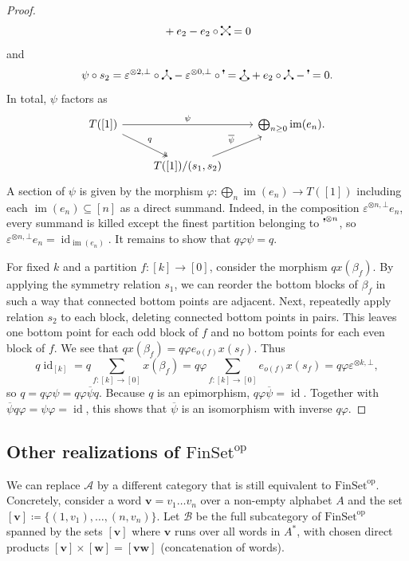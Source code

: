 \documentclass[11pt]{amsart}
\newcommand{\pd}[2][black]{\filldraw[#1] (#2) circle (1.5pt)} %
\newcommand\crossing{\tikz[baseline=(origin.base),scale=0.5]{
    \coordinate (origin) at (0,0); %
    \pd{0,0}; \pd{.5,0}; \pd{0,.5}; \pd{.5,.5};
    \draw (0,0) -- (.5,.5);
    \draw (.5,0) -- (0,.5);
}}
\newcommand\comult{\tikz[baseline=(origin.base),scale=0.5]{
    \coordinate (origin) at (0,0); %
    \pd{.25,.5}; \pd{0,0}; \pd{.5,0};
    \draw (.25,.5) -- (.25,.25) -- (0,0);
    \draw (.25,.25) -- (.5,0);
}}
\newcommand\upperdots[1]{\tikz[baseline=(origin.base),scale=0.5]{
    \coordinate (origin) at (0,0);
    \foreach \i in {0,...,\numexpr#1-1\relax} {
        \pd{0.5*\i,.5};
        \draw (0.5*\i,.3) -- (0.5*\i,.5);
    }
}}
\theoremstyle{definition}
\theoremstyle{remark}
\newcommand\cA{\mathcal A}
\newcommand\cB{\mathcal B}
\newcommand\id{\operatorname{id}}
\newcommand\im{\operatorname{im}}
\renewcommand\:\colon
\renewcommand\o\otimes
\renewcommand\o\otimes
\renewcommand\:\colon
\newcommand\FinSet{\mathrm{FinSet}}
\newcommand\op{^{\mathrm{op}}}
\newcommand\eps{\varepsilon}
\newcommand\vfi{\varphi}
\begin{document}
\begin{proof}
\[{        } + e_2 - e_2 \circ \crossing = 0
    \]
    and
    \[
        \psi \circ s_2 = \eps^{\o 2,\bot} \circ \comult - \eps^{\o 0,\bot} \circ \upperdots{1} = \tikz[baseline=(origin.base),scale=0.5]{
            \coordinate (origin) at (0,0);
            \pd{.25,.5}; \pd{0,0}; \pd{.5,0};
            \draw (.25,.5) -- (.25, .25) -- (0,0) to[out=down,in=down] (.5,0) -- (.25, .25);
        } + e_2 \circ \comult - \upperdots{1} = 0.
    \]
    In total, $\psi$ factors as
    \[\begin{tikzcd}
        T([1]) \arrow{rr}{\psi} \arrow[two heads]{rd}{q} && \bigoplus_{n \geq 0} \im(e_n). \\
        & T([1])/(s_1, s_2) \arrow{ru}{\overline{\psi}} &
    \end{tikzcd}\]
    A section of $\psi$ is given by the morphism $\vfi: \bigoplus_n \im(e_n) \to T([1])$ including each $\im(e_n) \subseteq [n]$ as a direct summand. Indeed, in the composition $\eps^{\o n,\bot} e_n$, every summand is killed except the finest partition belonging to $\upperdots{1}^{\o n}$, so $\eps^{\o n,\bot} e_n = \id_{\im(e_n)}$. It remains to show that $q\vfi\psi=q$.
    
    For fixed $k$ and a partition $f: [k] \to [0]$, consider the morphism $q x(\beta_f)$. By applying the symmetry relation $s_1$, we can reorder the bottom blocks of $\beta_f$ in such a way that connected bottom points are adjacent. Next, repeatedly apply relation $s_2$ to each block, deleting connected bottom points in pairs. This leaves one bottom point for each odd block of $f$ and no bottom points for each even block of $f$. We see that $q x(\beta_f) = q \vfi e_{o(f)} x(s_f)$. Thus
    \[
        q \id_{[k]} = q \sum_{f: [k] \to [0]} x(\beta_f) = q \vfi \sum_{f: [k] \to [0]} e_{o(f)} x(s_f) = q \vfi \eps^{\o k,\bot},
    \]
    so $q = q \vfi \psi=q\vfi\overline{\psi}q$. Because $q$ is an epimorphism, $q\vfi\overline{\psi}=\id$. Together with $\overline{\psi}q\vfi=\psi\vfi=\id$, this shows that $\overline{\psi}$ is an isomorphism with inverse $q\vfi$.
\end{proof}


\subsection{Other realizations of \texorpdfstring{$\FinSet\op$}{(FinSet)op}} \label{ss:other-finset-op} We can replace $\cA$ by a different category that is still equivalent to $\FinSet\op$. Concretely, consider a word $\mathbf{v} = v_1 \dots v_n$ over a non-empty alphabet $A$ and the set $[\mathbf{v}] \coloneqq \{(1, v_1), \dots, (n, v_n)\}$. Let $\cB$ be the full subcategory of $\FinSet\op$ spanned by the sets $[\mathbf{v}]$ where $\mathbf{v}$ runs over all words in $A^*$, with chosen direct products $[\mathbf{v}] \times [\mathbf{w}] = [\mathbf{v}\mathbf{w}]$ (concatenation of words).
\end{document}
